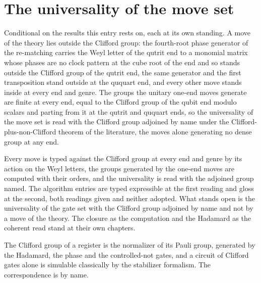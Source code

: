 \section{The universality of the move set}\label{mod:X-2-D538680-nmsu-t1}
\begin{chconditional}\label{box:X-2-D538680-nmsu-t1:1}
Conditional on the results this entry rests on, each at its own standing. A move of the theory lies outside the Clifford group: the fourth-root phase generator of the re-matching carries the Weyl letter of the qutrit end to a monomial matrix whose phases are no clock pattern at the cube root of the end and so stands outside the Clifford group of the qutrit end, the same generator and the first transposition stand outside at the ququart end, and every other move stands inside at every end and genre. The groups the unitary one-end moves generate are finite at every end, equal to the Clifford group of the qubit end modulo scalars and parting from it at the qutrit and ququart ends, so the universality of the move set is read with the Clifford group adjoined by name under the Clifford-plus-non-Clifford theorem of the literature, the moves alone generating no dense group at any end.
\end{chconditional}
Every move is typed against the Clifford group at every end and genre by its action on the Weyl letters, the groups generated by the one-end moves are computed with their orders, and the universality is read with the adjoined group named. The algorithm entries are typed expressible at the first reading and gloss at the second, both readings given and neither adopted. What stands open is the universality of the gate set with the Clifford group adjoined by name and not by a move of the theory. The closure as the computation and the Hadamard as the coherent read stand at their own chapters.
\begin{chbridge}
The Clifford group of a register is the normalizer of its Pauli group, generated by the Hadamard, the phase and the controlled-not gates, and a circuit of Clifford gates alone is simulable classically by the stabilizer formalism. The correspondence is by name.
\end{chbridge}

